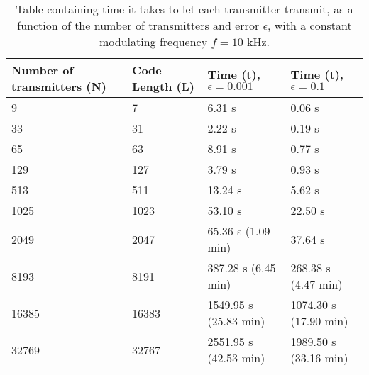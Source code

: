 \begin{table}[t]
	\centering
	\begin{tabular}{  | l | l | l | l | }

		\hline
		Number of transmitters (N)	& Code Length (L) 		& Time (t), $\epsilon = 0.001$				& Time (t), $\epsilon = 0.1$					\\ \hline

		9							& 7						& 6.31 s									& 0.06 s 										\\ \hline
		33							& 31					& 2.22 s									& 0.19 s 										\\ \hline
		65							& 63	 				& 8.91 s									& 0.77 s 										\\ \hline
		129							& 127					& 3.79 s									& 0.93 s  										\\ \hline
		513							& 511					& 13.24 s									& 5.62 s 										\\ \hline
		1025						& 1023					& 53.10 s									& 22.50 s 										\\ \hline
		2049						& 2047					& 65.36 s (1.09 min)						& 37.64 s										\\ \hline
		8193						& 8191					& 387.28 s (6.45 min)						& 268.38 s (4.47 min)							\\ \hline
		16385						& 16383					& 1549.95 s	(25.83 min)						& 1074.30 s	(17.90 min)							\\ \hline
		32769						& 32767					& 2551.95 s (42.53 min)						& 1989.50 s	(33.16 min)							\\ \hline


	\end{tabular}
	\caption{Table containing time it takes to let each transmitter transmit, as a function of the number of transmitters and error $\epsilon$, with a constant modulating frequency $f = 10$ kHz. }
	\label{tbl:probabilistic-method-time-as-function-N}

\end{table}




